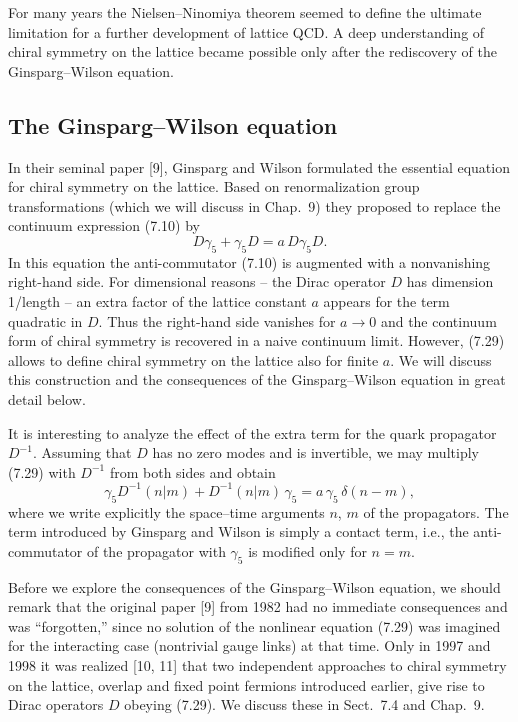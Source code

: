 For many years the Nielsen--Ninomiya theorem seemed to define the ultimate
limitation for a further development of lattice QCD. A deep understanding of
chiral symmetry on the lattice became possible only after the rediscovery of
the Ginsparg--Wilson equation.

\subsection{The Ginsparg--Wilson equation}

In their seminal paper [9], Ginsparg and Wilson formulated the essential
equation for chiral symmetry on the lattice. Based on renormalization group
transformations (which we will discuss in Chap.~9) they proposed to replace
the continuum expression (7.10) by
\begin{equation}
  D\gamma_5 + \gamma_5 D = a\,D\gamma_5 D .
\end{equation}
In this equation the anti-commutator (7.10) is augmented with a nonvanishing
right-hand side. For dimensional reasons -- the Dirac operator $D$ has
dimension 1/length -- an extra factor of the lattice constant $a$ appears for
the term quadratic in $D$. Thus the right-hand side vanishes for $a \to 0$ and
the continuum form of chiral symmetry is recovered in a naive continuum limit.
However, (7.29) allows to define chiral symmetry on the lattice also for
finite $a$. We will discuss this construction and the consequences of the
Ginsparg--Wilson equation in great detail below.

It is interesting to analyze the effect of the extra term for the quark
propagator $D^{-1}$. Assuming that $D$ has no zero modes and is invertible, we
may multiply (7.29) with $D^{-1}$ from both sides and obtain
\begin{equation}
  \gamma_5 D^{-1}(n|m) + D^{-1}(n|m)\,\gamma_5 = a\,\gamma_5\,\delta(n-m),
\end{equation}
where we write explicitly the space--time arguments $n$, $m$ of the
propagators. The term introduced by Ginsparg and Wilson is simply a contact
term, i.e., the anti-commutator of the propagator with $\gamma_5$ is modified
only for $n = m$.

Before we explore the consequences of the Ginsparg--Wilson equation, we should
remark that the original paper [9] from 1982 had no immediate consequences and
was ``forgotten,'' since no solution of the nonlinear equation (7.29) was
imagined for the interacting case (nontrivial gauge links) at that time. Only
in 1997 and 1998 it was realized [10, 11] that two independent approaches to
chiral symmetry on the lattice, overlap and fixed point fermions introduced
earlier, give rise to Dirac operators $D$ obeying (7.29). We discuss these in
Sect.~7.4 and Chap.~9.

